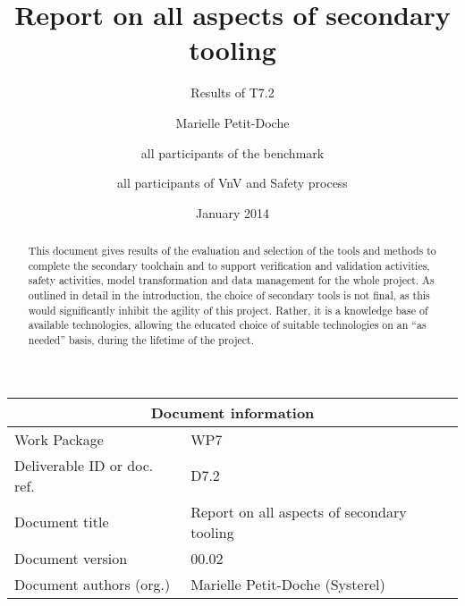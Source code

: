 \documentclass{template/openetcs_report}
\begin{document}
\frontmatter
{}




\title{ Report on all aspects of secondary tooling
}

\subtitle{Results of T7.2}


\date{January 2014}


\author{Marielle Petit-Doche}


\author{all participants of the benchmark}


\author{all participants of VnV  and Safety process}


 


\begin{abstract}
This document gives results of the evaluation and selection of  the tools and methods to complete the secondary toolchain and to support verification and validation activities, safety activities, model transformation and data management for the whole project.  As outlined in detail in the introduction, the choice of secondary tools is not final, as this would significantly inhibit the agility of this project.  Rather, it is a knowledge base of available technologies, allowing the educated choice of suitable technologies on an ``as needed'' basis, during the lifetime of the project.

\end{abstract}

\maketitle
\tableofcontents
\listoffiguresandtables
\newpage


\begin{tabular}{|p{4.4cm}|p{8.7cm}|}
\hline
\multicolumn{2}{|c|}{Document information} \\
\hline
Work Package &  WP7  \\
Deliverable ID or doc. ref. & D7.2\\
\hline
Document title & Report on all aspects of secondary tooling \\
Document version & 00.02 \\
Document authors (org.)  & Marielle Petit-Doche (Systerel)  \\
\hline
\end{tabular}
\end{document}
